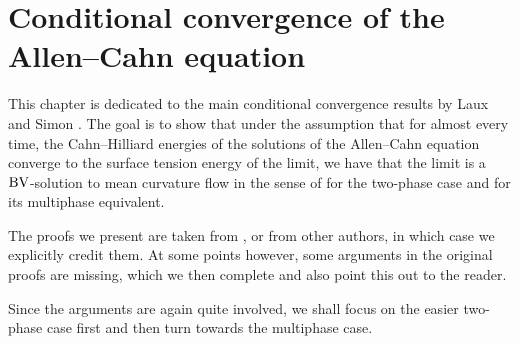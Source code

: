 \chapter{Conditional convergence of the Allen--Cahn equation}

This chapter is dedicated to the main conditional convergence results by Laux 
and Simon 
\cite{convergence_of_allen_cahn_equation_to_multiphase_mean_curvature_flow}.
The goal is to show that under the assumption that for almost every time, the 
Cahn--Hilliard energies of the solutions of the Allen--Cahn equation converge 
to the surface tension energy of the limit, we have that the limit is a $ \operatorname{BV} 
$-solution to mean curvature flow in the sense of  for the 
two-phase case and  for its multiphase equivalent.

The proofs we present are taken from 
\cite{convergence_of_allen_cahn_equation_to_multiphase_mean_curvature_flow}, 
or from other authors, 
in which case we explicitly credit them. At some points however, some arguments 
in the original proofs are missing, which we then complete and also point this 
out to the reader.

Since the arguments are again quite involved, we shall focus on the easier 
two-phase case first and then turn towards the multiphase case.


